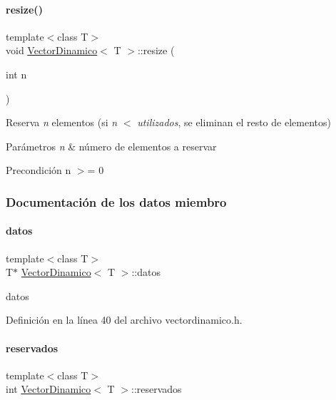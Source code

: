 \paragraph{\texorpdfstring{resize()}{resize()}}
{\footnotesize\ttfamily template$<$class T$>$ \\
void \hyperlink{classVectorDinamico}{Vector\+Dinamico}$<$ T $>$\+::resize (\begin{DoxyParamCaption}\item[{int}]{n }\end{DoxyParamCaption})}



Reserva {\itshape n} elementos (si {\itshape n} $<$ {\itshape utilizados}, se eliminan el resto de elementos) 


\begin{DoxyParams}{Parámetros}
{\em n} & número de elementos a reservar \\
\hline
\end{DoxyParams}
\begin{DoxyPrecond}{Precondición}
n $>$= 0 
\end{DoxyPrecond}


\subsubsection{Documentación de los datos miembro}
\mbox{\label{classVectorDinamico_abd9fcbd41bec3f3644ef89ce7b58ffe0}} 
\paragraph{\texorpdfstring{datos}{datos}}
{\footnotesize\ttfamily template$<$class T$>$ \\
T$\ast$ \hyperlink{classVectorDinamico}{Vector\+Dinamico}$<$ T $>$\+::datos\hspace{0.3cm}{\ttfamily [private]}}

datos 

Definición en la línea 40 del archivo vectordinamico.\+h.

\mbox{\label{classVectorDinamico_acb164c7ce16a21d4acd50eee38567b89}} 
\paragraph{\texorpdfstring{reservados}{reservados}}
{\footnotesize\ttfamily template$<$class T$>$ \\
int \hyperlink{classVectorDinamico}{Vector\+Dinamico}$<$ T $>$\+::reservados\hspace{0.3cm}{\ttfamily [private]}}

